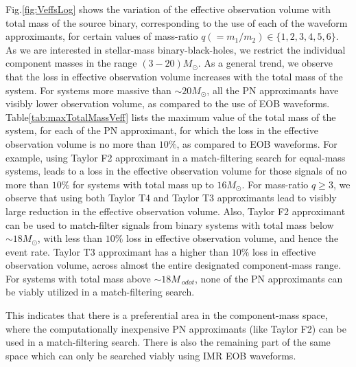 \documentclass[aps,
prd,
amsmath,
amssymb,
twocolumn,
floatfix,
groupedaddress]{revtex4-1}
\begin{document}
Fig.\ref{fig:VeffsLog} shows the variation of the effective observation volume with total mass of the source binary, corresponding to the use of each of the waveform approximants, for certain values of mass-ratio $q(=m_1/m_2)\in\{1,2,3,4,5,6\}$. As we are interested in stellar-mass binary-black-holes, we restrict the individual component masses in the range $(3-20)M_{\odot}$. As a general trend, we observe that the loss in effective observation volume increases with the total mass of the system. For systems more massive than $\sim20M_{\odot}$, all the PN approximants have visibly lower observation volume, as compared to the use of EOB waveforms. 
Table\ref{tab:maxTotalMassVeff} lists the maximum value of the total mass of the system, for each of the PN approximant, for which the loss in the effective observation volume is no more than $10\%$, as compared to EOB waveforms. For example, using Taylor F2 approximant in a match-filtering search for equal-mass systems, leads to a loss in the effective observation volume for those signals of no more than $10\%$ for systems with total mass up to $16M_{\odot}$. For mass-ratio $q\geq 3$, we observe that using both Taylor T4 and Taylor T3 approximants lead to visibly large reduction in the effective observation volume. Also, Taylor F2 approximant can be used to match-filter signals from binary systems with total mass below $\sim 18M_{\odot}$, with less than $10\%$ loss in effective observation volume, and hence the event rate. Taylor T3 approximant has a higher than $10\%$ loss in effective observation volume, across almost the entire designated component-mass range. For systems with total mass above $\sim18M_{\
odot}$, none of the PN approximants can be viably utilized in a match-filtering search.

This indicates that there is a preferential area in the component-mass space, where the computationally inexpensive PN approximants (like Taylor F2) can be used in a match-filtering search. There is also the remaining part of the same space which can only be searched viably using IMR EOB waveforms.
\end{document}
